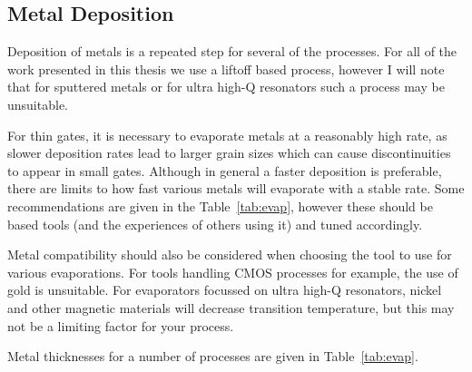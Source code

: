 \subsection{Metal Deposition}
\label{sec:metaldep}
Deposition of metals is a repeated step for several of the processes. For all of the work presented in this thesis
we use a liftoff based process, however I will note that for sputtered metals or for ultra high-Q resonators such
a process may be unsuitable.

For thin gates, it is necessary to evaporate metals at a reasonably high rate, as slower deposition rates lead to larger
grain sizes which can cause discontinuities to appear in small gates. Although in general a faster deposition is preferable,
there are limits to how fast various metals will evaporate with a stable rate. Some recommendations are given in the Table~\ref{tab:evap}, however
these should be based tools (and the experiences of others using it) and tuned accordingly.

Metal compatibility should also be considered when choosing the tool to use for various evaporations. For tools handling CMOS processes
for example, the use of gold is unsuitable. For evaporators focussed on ultra high-Q resonators, nickel and other magnetic materials
will decrease transition temperature, but this may not be a limiting factor for your process.

Metal thicknesses for a number of processes are given in Table~\ref{tab:evap}.

